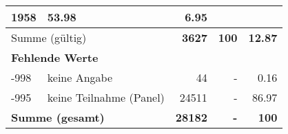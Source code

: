 \begin{longtable}{lXrrr}
       \num{1958} &
       \num[round-mode=places,round-precision=2]{53,98} &
         \num[round-mode=places,round-precision=2]{6,95} \\
     \midrule
     \multicolumn{2}{l}{Summe (gültig)} &
       \textbf{\num{3627}} &
     \textbf{100} &
       \textbf{\num[round-mode=places,round-precision=2]{12,87}} \\
     \multicolumn{5}{l}{\textbf{Fehlende Werte}}\\
       -998 &
       keine Angabe &
         \num{44} &
        - &
         \num[round-mode=places,round-precision=2]{0,16} \\
       -995 &
       keine Teilnahme (Panel) &
         \num{24511} &
        - &
         \num[round-mode=places,round-precision=2]{86,97} \\
     \midrule
     \multicolumn{2}{l}{\textbf{Summe (gesamt)}} &
          \textbf{\num{28182}} &
        \textbf{-} &
        \textbf{100} \\
     \bottomrule
     \end{longtable}
     

